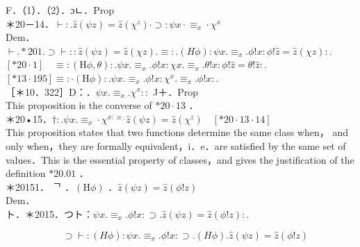 \documentclass[10pt]{article}
\begin{document}
F．（1）．（2）．ɔㄴ．Prop\\
＊20－14．$\vdash: . \hat{z}(\psi z)=\hat{z}\left(\chi^{z}\right) \cdot \supset: \psi x \cdot \equiv_{x} \cdot \chi^{x}$\\
Dem．\\
$\vdash . * 201 . \supset \vdash:: \hat{z}(\psi z)=\hat{z}(\chi z) . \equiv: .(H \phi): \psi x . \equiv_{x} . \phi!x: \phi!\hat{z}=\hat{z}(\chi z):$.\\
$[* 20 \cdot 1] \quad \equiv:(\mathrm{H} \phi, \theta): . \psi x . \equiv_{x} . \phi!x: \chi x . \equiv_{x} . \theta!x: \phi!\hat{z}=\theta!\hat{z}:$.\\
$[* 13 \cdot 195] \equiv: \cdot(\mathrm{H} \phi): . \psi x . \equiv_{x} . \phi!x: \chi^{x} . \equiv_{x} . \phi!x:$.\\
［＊10．322］D：．$\psi x . \equiv_{x} . \chi^{x}::$ J＋．Prop\\
This proposition is the converse of $* 20 \cdot 13$ ．\\
＊20•15．$\dagger: . \psi x . \equiv_{x} \cdot \chi^{x: \equiv .} \hat{z}(\psi z)=\hat{z}\left(\chi^{z}\right) \quad[* 20 \cdot 13 \cdot 14]$\\
This proposition states that two functions determine the same class when， and only when，they are formally equivalent，i．e．are satisfied by the same set of values．This is the essential property of classes，and gives the justification of the definition $* 20.01$ ．\\
＊20151． ᄀ ．$(\mathrm{H} \phi)$ ．$\hat{z}(\psi z)=\hat{z}(\phi!z)$\\
Dem．\\
ト．＊2015．つト：$\psi x . \equiv_{x} . \phi!x: \supset . \hat{z}(\psi z)=\hat{z}(\phi!z):$.


\begin{equation*}
[* 10 \cdot 11 \cdot 28] \quad \supset \vdash:(H \phi): \psi x . \equiv_{x} . \phi!x: \supset .(H \phi) . \hat{z}(\psi z)=\hat{z}(\phi!z) \tag{1}
\end{equation*}
\end{document}
